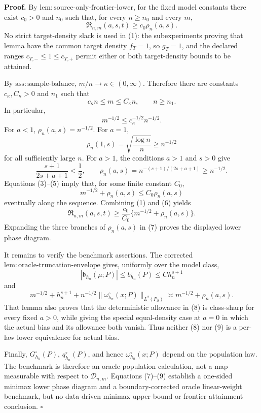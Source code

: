 \textbf{Proof.}
By \(\mathrm{lem:source\text{-}only\text{-}frontier\text{-}lower}\), for the fixed model constants there exist \(c_0>0\) and \(n_0\) such that, for every \(n\ge n_0\) and every \(m\),
\[
\mathfrak R_{n,m}(a,s,t)\ge c_0\rho_n(a,s).
\tag{1}
\]
No strict target-density slack is used in (1): the subexperiments proving that lemma have the common target density \(f_T=1\), so \(g_T=1\), and the declared ranges \(c_{T,-}\le1\le c_{T,+}\) permit either or both target-density bounds to be attained.

By \(\mathrm{ass:sample\text{-}balance}\), \(m/n\to\kappa\in(0,\infty)\). Therefore there are constants \(c_\kappa,C_\kappa>0\) and \(n_1\) such that
\[
c_\kappa n\le m\le C_\kappa n,
\qquad n\ge n_1.
\tag{2}
\]
In particular,
\[
m^{-1/2}\le c_\kappa^{-1/2}n^{-1/2}.
\tag{3}
\]
For \(a<1\), \(\rho_n(a,s)=n^{-1/2}\). For \(a=1\),
\[
\rho_n(1,s)=\sqrt{\frac{\log n}{n}}\ge n^{-1/2}
\tag{4}
\]
for all sufficiently large \(n\). For \(a>1\), the conditions \(a>1\) and \(s>0\) give
\[
\frac{s+1}{2s+a+1}<\frac12,
\qquad
\rho_n(a,s)=n^{-(s+1)/(2s+a+1)}\ge n^{-1/2}.
\tag{5}
\]
Equations (3)--(5) imply that, for some finite constant \(C_0\),
\[
m^{-1/2}+\rho_n(a,s)\le C_0\rho_n(a,s)
\tag{6}
\]
eventually along the sequence. Combining (1) and (6) yields
\[
\mathfrak R_{n,m}(a,s,t)
\ge \frac{c_0}{C_0}\{m^{-1/2}+\rho_n(a,s)\}.
\tag{7}
\]
Expanding the three branches of \(\rho_n(a,s)\) in (7) proves the displayed lower phase diagram.

It remains to verify the benchmark assertions. The corrected
\(\mathrm{lem:oracle\text{-}truncation\text{-}envelope}\) gives, uniformly over the model class,
\[
|\mathfrak b_{h_n}(\mu;P)|\le b_{h_n}^{\circ}(P)\le C h_n^{s+1}
\tag{8}
\]
and
\[
m^{-1/2}+h_n^{s+1}
+n^{-1/2}\|\omega_{h_n}^{\circ}(x;P)\|_{L^2(P_S)}
\asymp m^{-1/2}+\rho_n(a,s).
\tag{9}
\]
That lemma also proves that the deterministic allowance in (8) is class-sharp for every fixed \(a>0\), while giving the special equal-density case at \(a=0\) in which the actual bias and its allowance both vanish. Thus neither (8) nor (9) is a per-law lower equivalence for actual bias.

Finally, \(G_{h_n}^{\circ}(P)\), \(q_{h_n}^{\circ}(P)\), and hence \(\omega_{h_n}^{\circ}(x;P)\) depend on the population law. The benchmark is therefore an oracle population calculation, not a map measurable with respect to \(\mathcal D_{n,m}\). Equations (7)--(9) establish a one-sided minimax lower phase diagram and a boundary-corrected oracle linear-weight benchmark, but no data-driven minimax upper bound or frontier-attainment conclusion. \(\square\)